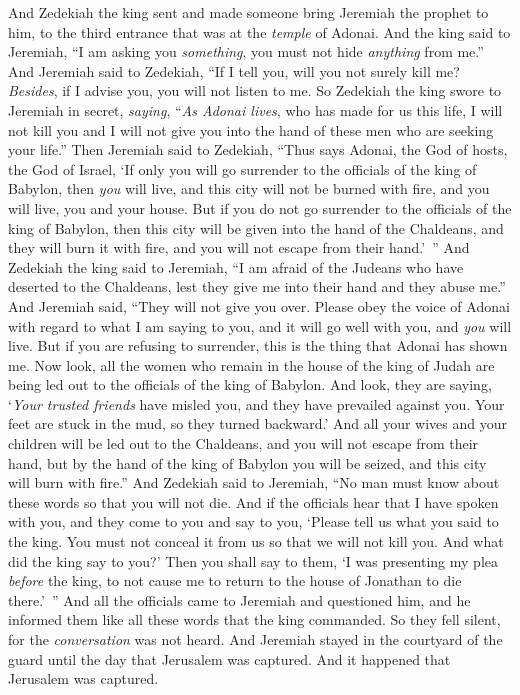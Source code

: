 \begin{biblechapter}
\verse And Zedekiah the king sent and made someone bring Jeremiah the prophet to him, to the third entrance that was at the \textit{temple} of Adonai. And the king said to Jeremiah, “I am asking you \textit{something}, you must not hide \textit{anything} from me.”
\verse And Jeremiah said to Zedekiah, “If I tell you, will you not surely kill me? \textit{Besides}, if I advise you, you will not listen to me.
\verse So Zedekiah the king swore to Jeremiah in secret, \textit{saying}, “\textit{As Adonai lives}, who has made for us this life, I will not kill you and I will not give you into the hand of these men who are seeking your life.”
\verse Then Jeremiah said to Zedekiah, “Thus says Adonai, the God of hosts, the God of Israel, ‘If only you will go surrender to the officials of the king of Babylon, then \textit{you} will live, and this city will not be burned with fire, and you will live, you and your house.
\verse But if you do not go surrender to the officials of the king of Babylon, then this city will be given into the hand of the Chaldeans, and they will burn it with fire, and you will not escape from their hand.’ ”
\verse And Zedekiah the king said to Jeremiah, “I am afraid of the Judeans who have deserted to the Chaldeans, lest they give me into their hand and they abuse me.”
\verse And Jeremiah said, “They will not give you over. Please obey the voice of Adonai with regard to what I am saying to you, and it will go well with you, and \textit{you} will live.
\verse But if you are refusing to surrender, this is the thing that Adonai has shown me.
\verse Now look, all the women who remain in the house of the king of Judah are being led out to the officials of the king of Babylon. And look, they are saying, ‘\textit{Your trusted friends} have misled you, 
and they have prevailed against you. 
Your feet are stuck in the mud, 
so they turned backward.’
\verse And all your wives and your children will be led out to the Chaldeans, and you will not escape from their hand, but by the hand of the king of Babylon you will be seized, and this city will burn with fire.”
\verse And Zedekiah said to Jeremiah, “No man must know about these words so that you will not die.
\verse And if the officials hear that I have spoken with you, and they come to you and say to you, ‘Please tell us what you said to the king. You must not conceal it from us so that we will not kill you. And what did the king say to you?’
\verse Then you shall say to them, ‘I was presenting my plea \textit{before} the king, to not cause me to return to the house of Jonathan to die there.’ ”
\verse And all the officials came to Jeremiah and questioned him, and he informed them like all these words that the king commanded. So they fell silent, for the \textit{conversation} was not heard.
\verse And Jeremiah stayed in the courtyard of the guard until the day that Jerusalem was captured. And it happened that Jerusalem was captured.
\end{biblechapter}

